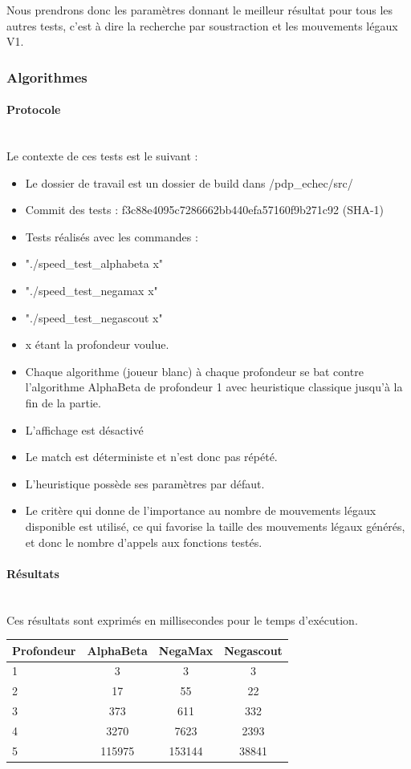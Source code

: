 \huge\documentclass{article}
\begin{document}
Nous prendrons donc les paramètres donnant le meilleur résultat pour tous les autres tests, c'est à dire la recherche par soustraction et les mouvements légaux V1.

\subsubsection{Algorithmes}
\paragraph{Protocole}
~~\\
\newline
Le contexte de ces tests est le suivant :
\begin{itemize}
    \item Le dossier de travail est un dossier de build dans /pdp\_echec/src/
    \item Commit des tests  : f3c88e4095c7286662bb440efa57160f9b271c92 (SHA-1)
    \item Tests réalisés avec les commandes : 
    \item "./speed\_test\_alphabeta x"
    \item "./speed\_test\_negamax x"
    \item "./speed\_test\_negascout x"
    \item x étant la profondeur voulue.
    \item Chaque algorithme (joueur blanc) à chaque profondeur se bat contre l'algorithme AlphaBeta de profondeur 1 avec heuristique classique jusqu'à la fin de la partie.
    \item L'affichage est désactivé
    \item Le match est déterministe et n'est donc pas répété.
    \item L'heuristique possède ses paramètres par défaut.
    \item Le critère qui donne de l'importance au nombre de mouvements légaux disponible est utilisé, ce qui favorise la taille des mouvements légaux générés, et donc le nombre d'appels aux fonctions testés.
\end{itemize}
\paragraph{Résultats}
~~\\
\newline
Ces résultats sont exprimés en millisecondes pour le temps d'exécution.
\begin{center}
   \begin{tabular}{ | l | c | c | c | }
     \hline
     Profondeur & AlphaBeta & NegaMax & Negascout \\ \hline
     1  & 3 & 3 & 3 \\ \hline
     2  & 17 & 55 & 22\\ \hline
     3  & 373 & 611 & 332\\ \hline
     4  & 3270 & 7623 & 2393\\ \hline
     5  & 115975 & 153144 & 38841\\ 
     \hline
   \end{tabular}
\end{center}
\end{document}
